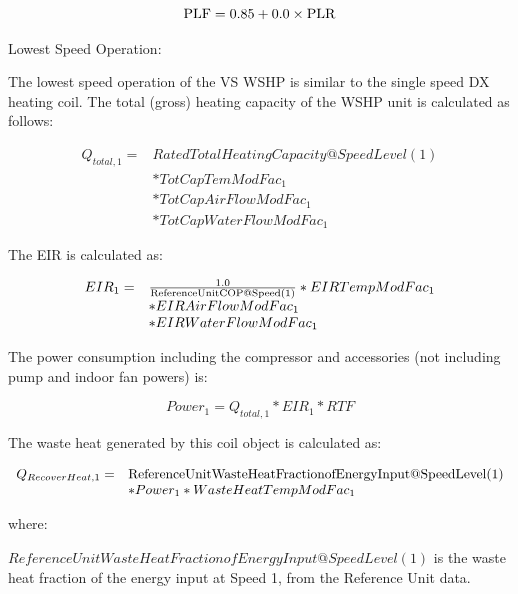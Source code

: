 \begin{equation}
{\rm{PLF}} = 0.85 + 0.0 \times {\rm{PLR}}
\end{equation}

Lowest Speed Operation:

The lowest speed operation of the VS WSHP is similar to the single speed DX heating coil. The total (gross) heating capacity of the WSHP unit is calculated as follows:

\begin{equation}
\begin{array}{rl}
{Q_{total,1}} =& RatedTotalHeatingCapacity@SpeedLevel\left( 1 \right) \\
               &*TotCapTemModFa{c_1} \\
               &*TotCapAirFlowModFa{c_1} \\
               &*TotCapWaterFlowModFa{c_1}
\end{array}
\end{equation}

The EIR is calculated as:

\begin{equation}
  \begin{array}{rl}
    EIR_1 =& \frac{1.0}{\rm{ReferenceUnitCOP@Speed(1)}} * EIRTempModFac_1 \\
          &* EIRAirFlowModFac_1 \\
          &* EIRWaterFlowModFac_1
  \end{array}
\end{equation}

The power consumption including the compressor and accessories (not including pump and indoor fan powers) is:

\begin{equation}
Powe{r_1} = {Q_{total,1}}*EI{R_1}*RTF
\end{equation}

The waste heat generated by this coil object is calculated as:

\begin{equation}
  \begin{array}{rl}
    Q_{RecoverHeat,1} =& \rm{ReferenceUnitWasteHeatFractionofEnergyInput@SpeedLevel(1)} \\
                       &* Power_1 * WasteHeatTempModFac_1
  \end{array}
\end{equation}

where:

\(ReferenceUnitWasteHeatFractionofEnergyInput@SpeedLevel\left( 1 \right)\) is the waste heat fraction of the energy input at Speed 1, from the Reference Unit data.

